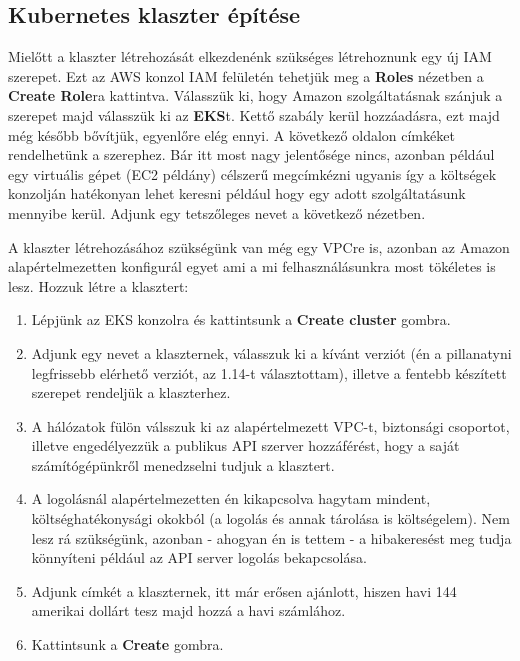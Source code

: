 \subsection{Kubernetes klaszter építése}
Mielőtt a klaszter létrehozását elkezdenénk szükséges létrehoznunk egy új IAM szerepet. Ezt az AWS konzol IAM felületén tehetjük meg a \textbf{Roles} nézetben a \textbf{Create Role}ra kattintva. Válasszük ki, hogy Amazon szolgáltatásnak szánjuk a szerepet majd válasszük ki az \textbf{EKS}t. Kettő szabály kerül hozzáadásra, ezt majd még később bővítjük, egyenlőre elég ennyi. A következő oldalon címkéket rendelhetünk a szerephez. Bár itt most nagy jelentősége nincs, azonban például egy virtuális gépet (EC2 példány) célszerű megcímkézni ugyanis így a költségek konzolján hatékonyan lehet keresni például hogy egy adott szolgáltatásunk mennyibe kerül. Adjunk egy tetszőleges nevet a következő nézetben.

A klaszter létrehozásához szükségünk van még egy VPCre is, azonban az Amazon alapértelmezetten konfigurál egyet ami a mi felhasználásunkra most tökéletes is lesz. Hozzuk létre a klasztert:
\begin{enumerate}
    \item Lépjünk az EKS konzolra és kattintsunk a \textbf{Create cluster} gombra.
    \item Adjunk egy nevet a klaszternek, válasszuk ki a kívánt verziót (én a pillanatyni legfrissebb elérhető verziót, az 1.14-t választottam), illetve a fentebb készített szerepet rendeljük a klaszterhez.
    \item A hálózatok fülön válsszuk ki az alapértelmezett VPC-t, biztonsági csoportot, illetve engedélyezzük a publikus API szerver hozzáférést, hogy a saját számítógépünkről menedzselni tudjuk a klasztert.
    \item A logolásnál alapértelmezetten én kikapcsolva hagytam mindent, költséghatékonysági okokból (a logolás és annak tárolása is költségelem). Nem lesz rá szükségünk, azonban - ahogyan én is tettem - a hibakeresést meg tudja könnyíteni például az API server logolás bekapcsolása.
    \item Adjunk címkét a klaszternek, itt már erősen ajánlott, hiszen havi 144 amerikai dollárt tesz majd hozzá a havi számlához.
    \item Kattintsunk a \textbf{Create} gombra.
\end{enumerate}


